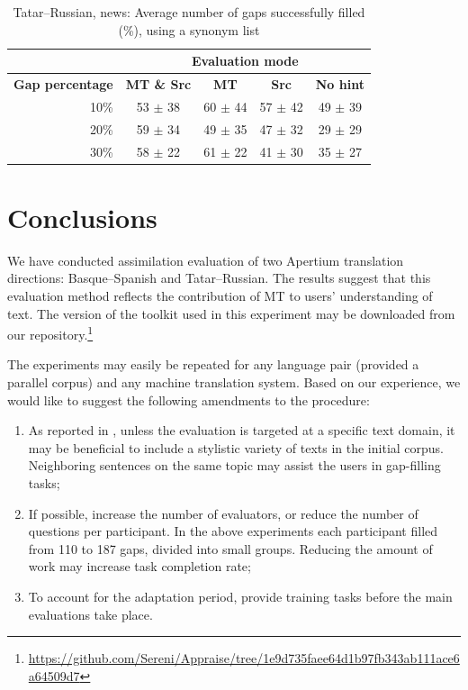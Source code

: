 \documentclass[11pt]{article}
\newcommand{\comment}[1]{}
\begin{document}
\begin{table}
\centering
\begin{tabular}{|r |*{4}{c}|}
\hline
  &\multicolumn{4}{c|}{\textbf{Evaluation mode}}\\
\hline
\textbf{Gap percentage} & \textbf{MT \& Src} & \textbf{MT} & \textbf{Src} & \textbf{No hint} \\
\hline
10\%&53 \(\pm\) 38&60 \(\pm\) 44&57 \(\pm\) 42&49 \(\pm\) 39\\
20\%&59 \(\pm\) 34&49 \(\pm\) 35&47 \(\pm\) 32&29 \(\pm\) 29\\
30\%&58 \(\pm\) 22&61 \(\pm\) 22&41 \(\pm\) 30&35 \(\pm\) 27\\
\hline
\end{tabular}
\caption {Tatar--Russian, news: Average number of gaps successfully filled (\%), using a synonym list} 
\label{table:rus-news} 
\end{table}

\section{Conclusions}
\label{sec:conclusion}
We have conducted assimilation evaluation of two Apertium translation directions: Basque--Spanish and Tatar--Russian. The results suggest that this evaluation method reflects the contribution of MT to users' understanding of text. The version of the toolkit used in this 
experiment may be downloaded from our repository.\footnote{{\url{https://github.com/Sereni/Appraise/tree/1e9d735faee64d1b97fb343ab111ace6a64509d7}}}

The experiments may easily be repeated for any language pair (provided a parallel corpus) and
any machine translation system. Based on our experience, we would like to suggest the following amendments to the procedure:
\begin{enumerate}
\item As reported in \cite{oregan13}, unless the evaluation is targeted at a specific text domain, it may be beneficial to include a stylistic variety of texts in the initial corpus. Neighboring sentences on the same topic may assist the users in gap-filling tasks;
\item If possible, increase the number of evaluators, or reduce the number of questions per participant. In the above experiments each participant filled from 110 to 187 gaps, divided into small groups. Reducing the amount of work may increase task completion rate;\comment{MLF's crazy idea: recaptchas?}\comment{EA: the participants did not leave the gaps empty, they just did not attempt the next portions of evaluation after finishing some and getting bored. or did I misunderstand the use of captchas? }
\item To account for the adaptation period, provide training tasks before the main evaluations take place.
\end{enumerate}
\end{document}
